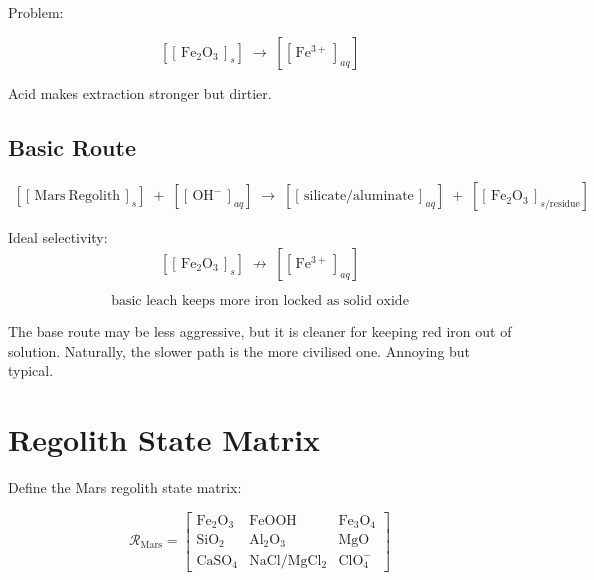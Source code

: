 \documentclass[11pt,a4paper]{article}
\newcommand{\cidb}[2]{\!\left[\!\left[\,#1\,\right]_{\!#2}\!\right]}
\newcommand{\Rmat}{\mathcal{R}_{\mathrm{Mars}}}%
\begin{document}
Problem:
\begin{keybox}
\[
\cidb{\mathrm{Fe_2O_3}}{s}
\;\rightarrow\;
\cidb{\mathrm{Fe^{3+}}}{aq}
\]
\end{keybox}

Acid makes extraction stronger but dirtier.

\subsection*{Basic Route}

\begin{align*}
\cidb{\mathrm{Mars~Regolith}}{s}
\;+\;\cidb{\mathrm{OH^-}}{aq}
\;\rightarrow\;
\cidb{\text{silicate/aluminate}}{aq}
\;+\;\cidb{\mathrm{Fe_2O_3}}{s/\text{residue}}
\end{align*}

Ideal selectivity:
\[
\cidb{\mathrm{Fe_2O_3}}{s}
\;\not\rightarrow\;
\cidb{\mathrm{Fe^{3+}}}{aq}
\]

\begin{keybox}
\[\text{basic leach keeps more iron locked as solid oxide}\]
\end{keybox}

\begin{smlaw}
The base route may be less aggressive, but it is cleaner for keeping red iron
out of solution.  Naturally, the slower path is the more civilised one.
Annoying but typical.
\end{smlaw}

\section{Regolith State Matrix}

Define the Mars regolith state matrix:

\[
\Rmat
=
\begin{bmatrix}
\mathrm{Fe_2O_3}   & \mathrm{FeOOH}       & \mathrm{Fe_3O_4}  \\[4pt]
\mathrm{SiO_2}     & \mathrm{Al_2O_3}     & \mathrm{MgO}      \\[4pt]
\mathrm{CaSO_4}    & \mathrm{NaCl/MgCl_2} & \mathrm{ClO_4^-}
\end{bmatrix}
\]
\end{document}
